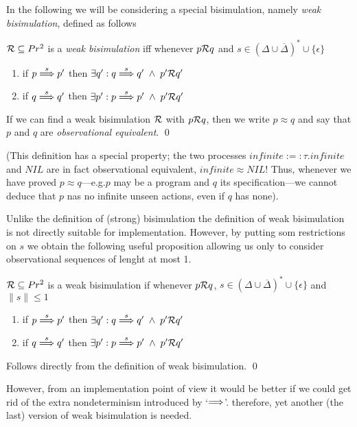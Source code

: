 In the following we will be considering a special bisimulation, namely {\it weak bisimulation\/}, defined as follows

\begin{definition}\label{defWeakBisim}
${\cal R}\subseteq Pr^2$ is a {\em weak bisimulation\/} iff whenever $p{\cal R}q$ and $s\in (\Delta\cup\overline{\Delta})^* \cup \{\epsilon\}$
\begin{enumerate}
\item if $p\stackrel{s}{\Longrightarrow}p'$ then $\exists q': q\stackrel{s}{\Longrightarrow}q'\;\wedge\; p'{\cal R}q'$
\item if $q\stackrel{s}{\Longrightarrow}q'$ then $\exists p': p\stackrel{s}{\Longrightarrow}p'\;\wedge\; p'{\cal R}q'$
\end{enumerate}
If we can find a weak bisimulation $\cal R$ with $p{\cal R}q$, then we write $p\approx q$ and say that $p$ and $q$ are {\em observational equivalent\/}.
\qed
\end{definition}

(This definition has a special property; the two processes $infinite :=: \tau.infinite$ and $NIL$ are in fact observational equivalent, $infinite\approx NIL$! Thus, whenever we have proved $p\approx q$---e.g.\@ $p$ may be a program and $q$ its specification---we cannot deduce that $p$ nas no infinite unseen actions, even if $q$ has none).

Unlike the definition of (strong) bisimulation the definition of weak bisimulation is not directly suitable for implementation. However, by putting som restrictions on $s$ we obtain the following useful proposition allowing us only to consider observational sequences of lenght at most 1.

\begin{proposition}\label{propWeakBisimI}
${\cal R}\subseteq Pr^2$ is a weak bisimulation if whenever $p{\cal R}q$, $s\in (\Delta\cup\overline{\Delta})^*\cup\{\epsilon\}$ and $\|s\|\leq1$
\begin{enumerate}
\item if $p\stackrel{s}{\Longrightarrow}p'$ then $\exists q': q\stackrel{s}{\Longrightarrow}q'\;\wedge\; p'{\cal R}q'$
\item if $q\stackrel{s}{\Longrightarrow}q'$ then $\exists p': p\stackrel{s}{\Longrightarrow}p'\;\wedge\; p'{\cal R}q'$
\end{enumerate}
\proof Follows directly from the definition of weak bisimulation.
\qed
\end{proposition}

\noindent
However, from an implementation point of view it would be better if we could get rid of the extra nondeterminism introduced by `$\stackrel{}{\Longrightarrow}$'. therefore, yet another (the last) version of weak bisimulation is needed.

